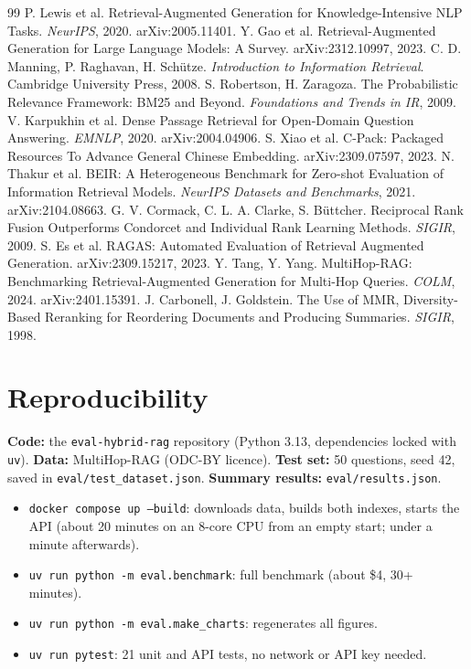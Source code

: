 \documentclass[10pt,twocolumn]{article}
\newcommand{\code}[1]{\texttt{\small #1}}
\begin{document}
\small
\begin{thebibliography}{99}
\setlength{\itemsep}{1pt}
 P. Lewis et al. Retrieval-Augmented Generation for Knowledge-Intensive NLP Tasks. \emph{NeurIPS}, 2020. arXiv:2005.11401.
 Y. Gao et al. Retrieval-Augmented Generation for Large Language Models: A Survey. arXiv:2312.10997, 2023.
 C. D. Manning, P. Raghavan, H. Sch\"utze. \emph{Introduction to Information Retrieval}. Cambridge University Press, 2008.
 S. Robertson, H. Zaragoza. The Probabilistic Relevance Framework: BM25 and Beyond. \emph{Foundations and Trends in IR}, 2009.
 V. Karpukhin et al. Dense Passage Retrieval for Open-Domain Question Answering. \emph{EMNLP}, 2020. arXiv:2004.04906.
 S. Xiao et al. C-Pack: Packaged Resources To Advance General Chinese Embedding. arXiv:2309.07597, 2023.
 N. Thakur et al. BEIR: A Heterogeneous Benchmark for Zero-shot Evaluation of Information Retrieval Models. \emph{NeurIPS Datasets and Benchmarks}, 2021. arXiv:2104.08663.
 G. V. Cormack, C. L. A. Clarke, S. B\"uttcher. Reciprocal Rank Fusion Outperforms Condorcet and Individual Rank Learning Methods. \emph{SIGIR}, 2009.
 S. Es et al. RAGAS: Automated Evaluation of Retrieval Augmented Generation. arXiv:2309.15217, 2023.
 Y. Tang, Y. Yang. MultiHop-RAG: Benchmarking Retrieval-Augmented Generation for Multi-Hop Queries. \emph{COLM}, 2024. arXiv:2401.15391.
 J. Carbonell, J. Goldstein. The Use of MMR, Diversity-Based Reranking for Reordering Documents and Producing Summaries. \emph{SIGIR}, 1998.
\end{thebibliography}
\normalsize

\appendix
\section{Reproducibility}\label{app:repro}
\textbf{Code:} the \code{eval-hybrid-rag} repository (Python 3.13, dependencies locked with \code{uv}). \textbf{Data:} MultiHop-RAG (ODC-BY licence). \textbf{Test set:} 50 questions, seed 42, saved in \code{eval/test\_dataset.json}. \textbf{Summary results:} \code{eval/results.json}.

\begin{itemize}
\item \code{docker compose up --build}: downloads data, builds both indexes, starts the API (about 20 minutes on an 8-core CPU from an empty start; under a minute afterwards).
\item \code{uv run python -m eval.benchmark}: full benchmark (about \$4, 30+ minutes).
\item \code{uv run python -m eval.make\_charts}: regenerates all figures.
\item \code{uv run pytest}: 21 unit and API tests, no network or API key needed.
\end{itemize}
\end{document}
